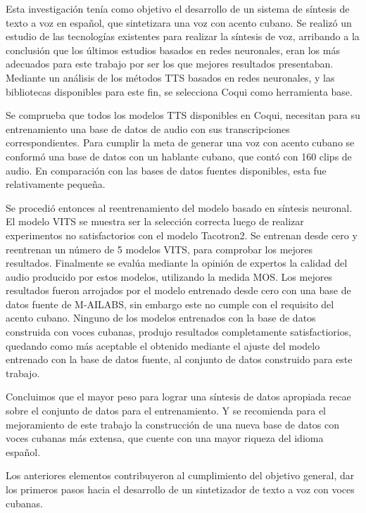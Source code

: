 \begin{conclusions}    
Esta investigación tenía como objetivo el desarrollo de un sistema de síntesis de texto a voz en español, que sintetizara una voz con acento cubano. Se realizó un estudio de las tecnologías existentes para realizar la síntesis de voz, arribando a la conclusión que los últimos estudios basados en redes neuronales, eran los más adecuados para este trabajo por ser los que mejores resultados presentaban. Mediante un análisis de los métodos TTS basados en redes neuronales, y las bibliotecas disponibles para este fin, se selecciona Coqui como herramienta base. 

Se comprueba que todos los modelos TTS disponibles en Coqui, necesitan para su entrenamiento una base de datos de audio con sus transcripciones correspondientes. Para cumplir la meta de generar una voz con acento cubano se conformó una base de datos con un hablante cubano, que contó con 160 clips de audio. En comparación con las bases de datos fuentes disponibles, esta fue relativamente pequeña. 

Se procedió entonces al reentrenamiento del modelo basado en síntesis neuronal. El modelo VITS se muestra ser la selección correcta luego de realizar experimentos no satisfactorios con el modelo Tacotron2. Se entrenan desde cero y reentrenan un número de 5 modelos VITS, para comprobar los mejores resultados. Finalmente se evalúa mediante la opinión de expertos la calidad del audio producido por estos modelos, utilizando la medida MOS. Los mejores resultados fueron arrojados por el modelo entrenado desde cero con una base de datos fuente de M-AILABS, sin embargo este no cumple con el requisito del acento cubano. Ninguno de los modelos entrenados con la base de datos construida con voces cubanas, produjo resultados completamente satisfactiorios, quedando como más aceptable el obtenido mediante el ajuste del modelo entrenado con la base de datos fuente, al conjunto de datos construido para este trabajo.

Concluimos que el mayor peso para lograr una síntesis de datos apropiada recae sobre el conjunto de datos para el entrenamiento. Y se recomienda para el mejoramiento de este trabajo la construcción de una nueva base de datos con voces cubanas más extensa, que cuente con una mayor riqueza del idioma español. 

Los anteriores elementos contribuyeron al cumplimiento del objetivo general, dar los primeros pasos hacia el desarrollo de un sintetizador de texto a voz con voces cubanas. 
    
    
   
\end{conclusions}
